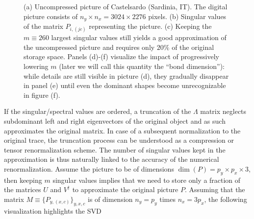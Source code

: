 \begin{figure}
    \caption{(a) Uncompressed picture of Castelsardo (Sardinia, IT).
    The digital picture consists of $n_y\times n_x=3024\times2276$ pixels. (b) Singular values of the matrix $P_{i,(jc)}$ representing the picture. (c) Keeping the $m\equiv260$ largest singular values still yields a good approximation of the uncompressed picture and requires only $20\%$ of the original storage space. Panels (d)-(f) visualize the impact of progressively lowering $m$ (later we will call this quantity the ``bond dimension''): while details are still visible in picture (d), they gradually disappear in panel (e) until even the dominant shapes become unrecognizable in figure (f).}
    \label{fig:svd_image_compression}
\end{figure}
If the singular/spectral values are ordered, a truncation of the $\Lambda$ matrix neglects subdominant left and right eigenvectors of the original object and as such approximates the original matrix.
In case of a subsequent normalization to the original trace, the truncation process can be understood as a compression or tensor renormalization scheme.
The number of singular values kept in the approximation is thus naturally linked to the accuracy of the numerical renormalization.
Assume the picture to be of dimensions $\dim(P)=p_y\times p_x\times 3$, then keeping $m$ singular values implies that we need to store only a fraction of the matrices $U$ and $V^\dag$ to approximate the original picture $P$.
Assuming that the matrix $M\equiv \{P_{y,(x,c)}\}_{y,x,c}$ is of dimension $n_y=p_y$ times $n_x=3p_x$, the following visualization highlights the SVD
